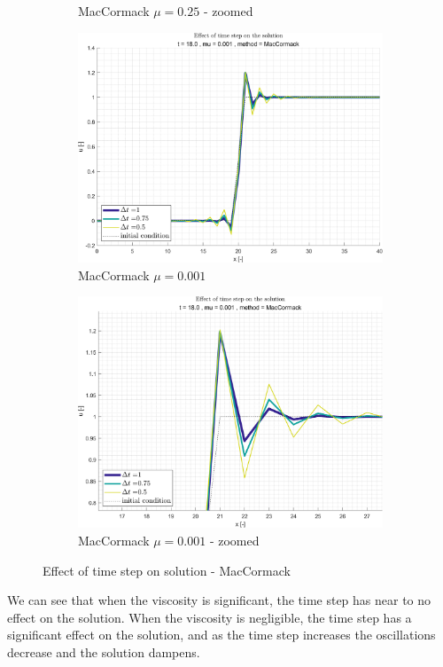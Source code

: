 \documentclass[11pt, a4paper]{article}
\begin{document}
\begin{figure}[H]
\begin{subfigure}[c]{.39\textwidth}
        \caption{MacCormack $\mu=0.25$ - zoomed}
        \label{fig:MacCormack_general_mu0.25_B}
    \end{subfigure}
    \begin{subfigure}[c]{.39\textwidth}
        \centering
        \includegraphics[width=\textwidth]{images/grap11.png}
        \caption{MacCormack $\mu=0.001$}
        \label{fig:MacCormack_general_mu0.001_A}
    \end{subfigure}
    \begin{subfigure}[c]{.39\textwidth}
        \centering
        \includegraphics[width=\textwidth]{images/grap11.1.png}
        \caption{MacCormack $\mu=0.001$ - zoomed}
        \label{fig:MacCormack_general_mu0.001_B}
    \end{subfigure}
    \caption{Effect of time step on solution - MacCormack}
        \label{fig:MacCormack_general}
\end{figure}
We can see that when the viscosity is significant, the time step has near to no effect on the solution. When the viscosity is negligible, the time step has a significant effect on the solution, and as the time step increases the oscillations decrease and the solution dampens.
\newpage
\end{document}
